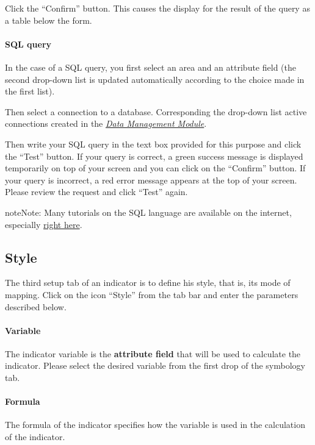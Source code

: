 \documentclass[letterpaper,10pt,english]{sphinxmanual}
\begin{document}
Click the ``Confirm'' button. This causes the display for the result of the query as a table below the form.


\paragraph{SQL query}
\label{indicators/indicatorspanel:requete-sql}
In the case of a SQL query, you first select an area and an attribute field (the second drop-down list is updated automatically according to the choice made in the first list).

Then select a connection to a database. Corresponding the drop-down list active connections created in the {\hyperref[data/index::doc]{\emph{\emph{Data Management Module}}}}.

Then write your SQL query in the text box provided for this purpose and click the ``Test'' button. If your query is correct, a green success message is displayed temporarily on top of your screen and you can click on the ``Confirm'' button. If your query is incorrect, a red error message appears at the top of your screen. Please review the request and click ``Test'' again.

\begin{notice}{note}{Note:}
Many tutorials on the SQL language are available on the internet, especially \href{http://sql.developpez.com/}{right here}.
\end{notice}


\subsection{Style}
\label{indicators/indicatorspanel:style}
The third setup tab of an indicator is to define his style, that is, its mode of mapping. Click on the icon ``Style'' from the tab bar and enter the parameters described below.
\paragraph{Variable}

The indicator variable is the \textbf{attribute field} that will be used to calculate the indicator. Please select the desired variable from the first drop of the symbology tab.
\paragraph{Formula}

The formula of the indicator specifies how the variable is used in the calculation of the indicator.
\end{document}

